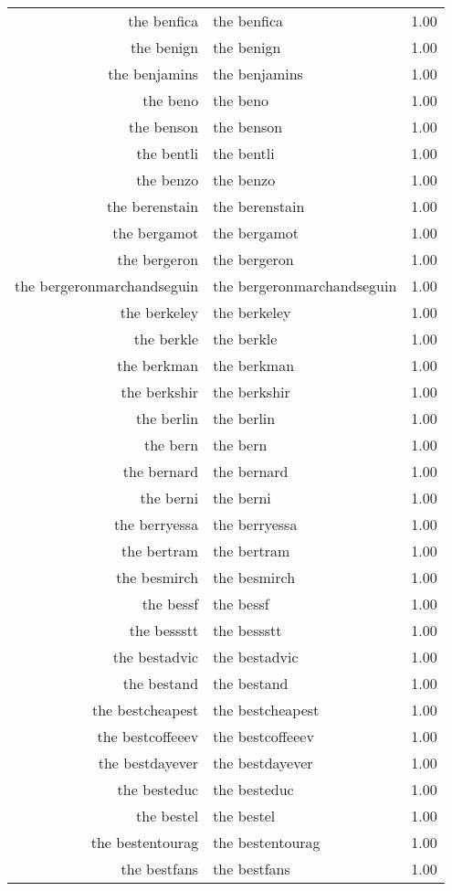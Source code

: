 \begin{table}[ht]
\begin{tabular}{rlr}
  the benfica & the benfica & 1.00 \\ 
  the benign & the benign & 1.00 \\ 
  the benjamins & the benjamins & 1.00 \\ 
  the beno & the beno & 1.00 \\ 
  the benson & the benson & 1.00 \\ 
  the bentli & the bentli & 1.00 \\ 
  the benzo & the benzo & 1.00 \\ 
  the berenstain & the berenstain & 1.00 \\ 
  the bergamot & the bergamot & 1.00 \\ 
  the bergeron & the bergeron & 1.00 \\ 
  the bergeronmarchandseguin & the bergeronmarchandseguin & 1.00 \\ 
  the berkeley & the berkeley & 1.00 \\ 
  the berkle & the berkle & 1.00 \\ 
  the berkman & the berkman & 1.00 \\ 
  the berkshir & the berkshir & 1.00 \\ 
  the berlin & the berlin & 1.00 \\ 
  the bern & the bern & 1.00 \\ 
  the bernard & the bernard & 1.00 \\ 
  the berni & the berni & 1.00 \\ 
  the berryessa & the berryessa & 1.00 \\ 
  the bertram & the bertram & 1.00 \\ 
  the besmirch & the besmirch & 1.00 \\ 
  the bessf & the bessf & 1.00 \\ 
  the bessstt & the bessstt & 1.00 \\ 
  the bestadvic & the bestadvic & 1.00 \\ 
  the bestand & the bestand & 1.00 \\ 
  the bestcheapest & the bestcheapest & 1.00 \\ 
  the bestcoffeeev & the bestcoffeeev & 1.00 \\ 
  the bestdayever & the bestdayever & 1.00 \\ 
  the besteduc & the besteduc & 1.00 \\ 
  the bestel & the bestel & 1.00 \\ 
  the bestentourag & the bestentourag & 1.00 \\ 
  the bestfans & the bestfans & 1.00 \\ 

\end{tabular}
\end{table}
